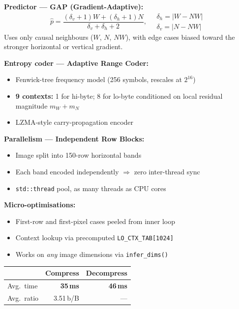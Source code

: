 \documentclass[a0paper,landscape]{baposter}
\newcommand{\compactlist}{\setlength{\itemsep}{0pt}\setlength{\parskip}{0pt}\setlength{\topsep}{1pt}}
\newcommand{\tightsection}{\vspace{0.35em}}
\begin{document}
\begin{poster}
{  \textbf{Predictor — GAP (Gradient-Adaptive):}
  {\small
  \[
    \hat{p}=\frac{(\delta_v+1)W+(\delta_h+1)N}{\delta_v+\delta_h+2},
    \quad
    \begin{gathered}
      \delta_h=|W-NW|\\[-0.2em]
      \delta_v=|N-NW|
    \end{gathered}
  \]
  }
  Uses only causal neighbours ($W$, $N$, $NW$), with edge cases biased toward
  the stronger horizontal or vertical gradient.

  \tightsection
  \textbf{Entropy coder — Adaptive Range Coder:}
  \begin{itemize}\compactlist
    \item Fenwick-tree frequency model (256 symbols, rescales at $2^{16}$)
    \item \textbf{9 contexts:} 1 for hi-byte; 8 for lo-byte conditioned on
          local residual magnitude $m_W + m_N$
    \item LZMA-style carry-propagation encoder
  \end{itemize}

  \tightsection
  \textbf{Parallelism — Independent Row Blocks:}
  \begin{itemize}\compactlist
    \item Image split into 150-row horizontal bands
    \item Each band encoded independently $\Rightarrow$ zero inter-thread sync
    \item \texttt{std::thread} pool, as many threads as CPU cores
  \end{itemize}

  \tightsection
  \textbf{Micro-optimisations:}
  \begin{itemize}\compactlist
    \item First-row and first-pixel cases peeled from inner loop
    \item Context lookup via precomputed \texttt{LO\_CTX\_TAB[1024]}
    \item Works on \emph{any} image dimensions via \texttt{infer\_dims()}
  \end{itemize}

  \tightsection
  \begin{center}\small
  \begin{tabular}{@{}lrr@{}}
    \toprule
    & \textbf{Compress} & \textbf{Decompress}\\
    \midrule
    Avg.\ time & \textbf{35\,ms} & \textbf{46\,ms}\\
    Avg.\ ratio & 3.51\,b/B & ---\\
    \bottomrule
  \end{tabular}
  \end{center}
}


\end{poster}
\end{document}
